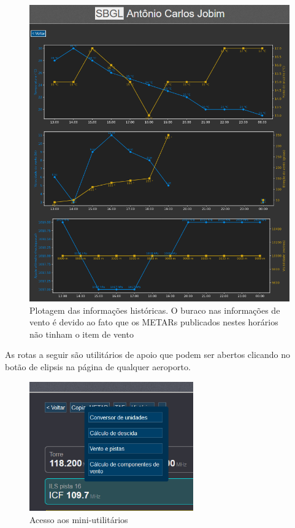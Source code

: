 \begin{figure}[H]
    \begin{center}
    \includegraphics[width=\linewidth]{img/img-history.png}
    \caption{Plotagem das informações históricas. O buraco nas informações de
    vento é devido ao fato que os METARs publicados nestes horários não tinham
    o item de vento}
    \label{fig:img-history.png}
    \end{center}
\end{figure}

As rotas a seguir são utilitários de apoio que podem ser abertos clicando
no botão de elipsis na página de qualquer aeroporto.

\begin{figure}[H]
    \begin{center}
    \includegraphics[width=200pt]{img/elipsis.png}
    \caption{Acesso aos mini-utilitários}
    \label{fig:menu-elipsis}
    \end{center}
\end{figure}

